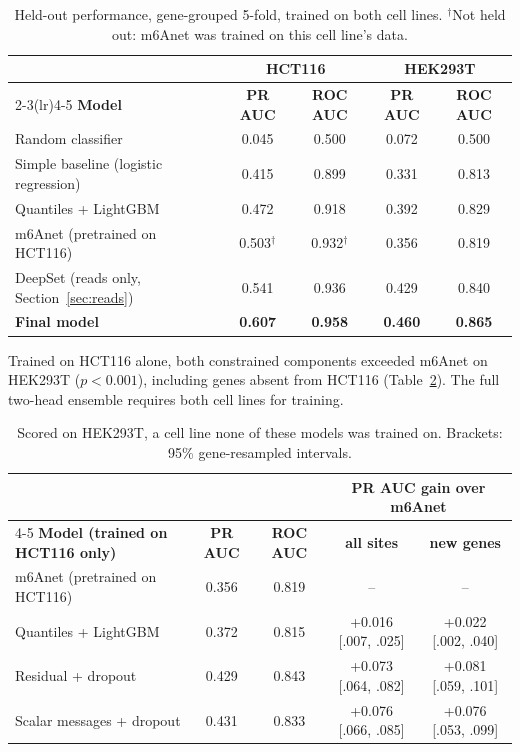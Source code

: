 \documentclass[11pt,a4paper]{article}
\begin{document}
\begin{table}[H]
    \centering\small
    \begin{tabular}{lcccc}
        \toprule
        & \multicolumn{2}{c}{\textbf{HCT116}} & \multicolumn{2}{c}{\textbf{HEK293T}} \\
        \cmidrule(lr){2-3}\cmidrule(lr){4-5}
        \textbf{Model} & \textbf{PR AUC} & \textbf{ROC AUC} & \textbf{PR AUC} & \textbf{ROC AUC} \\
        \midrule
        Random classifier & 0.045 & 0.500 & 0.072 & 0.500 \\
        Simple baseline (logistic regression) & 0.415 & 0.899 & 0.331 & 0.813 \\
        Quantiles + LightGBM & 0.472 & 0.918 & 0.392 & 0.829 \\
        m6Anet (pretrained on HCT116) & 0.503$^\dagger$ & 0.932$^\dagger$ & 0.356 & 0.819 \\
        DeepSet (reads only, Section~\ref{sec:reads}) & 0.541 & 0.936 & 0.429 & 0.840 \\
        \textbf{Final model} & \textbf{0.607} & \textbf{0.958} & \textbf{0.460} & \textbf{0.865} \\
        \bottomrule
    \end{tabular}
    \caption{Held-out performance, gene-grouped 5-fold, trained on both cell
    lines. $^\dagger$Not held out: m6Anet was trained on this cell line's data.}
    \label{tab:model_comparison}
\end{table}

Trained on HCT116 alone, both constrained components exceeded m6Anet on
HEK293T ($p<0.001$), including genes absent from HCT116
(Table~\ref{tab:m6anet_gain}). The full two-head ensemble requires both
cell lines for training.

\begin{table}[H]
    \centering\small
    \begin{tabular}{lcccc}
        \toprule
        & & & \multicolumn{2}{c}{\textbf{PR AUC gain over m6Anet}} \\
        \cmidrule(lr){4-5}
        \textbf{Model (trained on HCT116 only)} & \textbf{PR AUC} & \textbf{ROC AUC} & \textbf{all sites} & \textbf{new genes} \\
        \midrule
        m6Anet (pretrained on HCT116) & 0.356 & 0.819 & -- & -- \\
        Quantiles + LightGBM & 0.372 & 0.815 & +0.016 [.007, .025] & +0.022 [.002, .040] \\
        Residual + dropout & 0.429 & 0.843 & +0.073 [.064, .082] & +0.081 [.059, .101] \\
        Scalar messages + dropout & 0.431 & 0.833 & +0.076 [.066, .085] & +0.076 [.053, .099] \\
        \bottomrule
    \end{tabular}
    \caption{Scored on HEK293T, a cell line none of these models was
    trained on. Brackets: 95\% gene-resampled intervals.}
    \label{tab:m6anet_gain}
\end{table}
\end{document}

